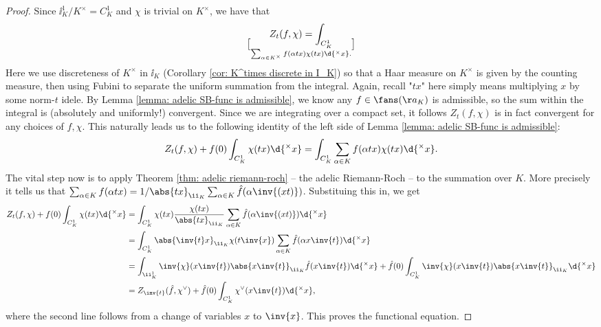\documentclass[11pt, x11names, openany]{book}
\begin{document}
\begin{proof}
Since $\ii_K^1 /K^\times = C^1_K $ and $\chi$ is trivial on $K^\times$, we have that
\begin{equation*}
    Z_t(f, \chi) = \int_{C^1_K} \brack{\sum_{\alpha \in K^\times} f(\alpha t x)}\chi(tx)\d{^\times x}.
\end{equation*}
Here we use discreteness of $K^\times$ in $\ii_K$ (Corollary \ref{cor: K^times discrete in I_K}) so that a Haar measure on $K^\times$ is given by the counting measure, then using Fubini to separate the uniform summation from the integral. Again, recall "$tx$" here simply means multiplying $x$ by some norm-$t$ idele. By Lemma \ref{lemma: adelic SB-func is admissible}, we know any $f \in \fans(\aa_K)$ is admissible, so the sum within the integral is (absolutely and uniformly!) convergent. Since we are integrating over a compact set, it follows $Z_t(f, \chi)$ is in fact convergent for any choices of $f, \chi$. This naturally leads us to the following identity of the left side of Lemma \ref{lemma: adelic SB-func is admissible}:
\begin{equation*}
    Z_t(f, \chi) + f(0) \int_{C^1_K} \chi(tx)\d{^\times x} = \int_{C^1_K} \sum_{\alpha \in K}f(\alpha t x) \chi(tx)\d{^\times x} . 
\end{equation*}
The vital step now is to apply Theorem \ref{thm: adelic riemann-roch} -- the adelic Riemann-Roch -- to the summation over $K$. More precisely it tells us that $\sum_{\alpha \in K}f(\alpha tx) = 1/\abs{tx}_{\ii_K} \sum_{\alpha \in K} \hat{f}(\alpha \inv{(xt)})$. Substituing this in, we get
\begin{align*}
    Z_t(f, \chi) + f(0) \int_{C^1_K} \chi(tx)\d{^\times x} &= \int_{C^1_K} \chi(tx) \frac{\chi(tx)}{\abs{tx}_{\ii_K}} \sum_{\alpha \in K}\hat{f}(\alpha \inv{(xt)}) \d{^\times x}\\
    &= \int_{C^1_K} \abs{\inv{t}x}_{\ii_K}\chi(t \inv{x}) \sum_{\alpha \in K}\hat{f}(\alpha x \inv{t}) \d{^\times x}\\
    &= \int_{\ii_K^1} \inv{\chi}(x\inv{t})\abs{x \inv{t}}_{\ii_K} \hat{f}(x \inv{t}) \d{^\times x} + \hat{f}(0) \int_{C^1_K} \inv{\chi}(x\inv{t})\abs{x \inv{t}}_{\ii_K} \d{^\times x}\\
    &= Z_{\inv{t}}(\hat{f}, \chi^\lor) + \hat{f}(0) \int_{C^1_K}\chi^\lor(x \inv{t})\d{^\times x},
\end{align*}
where the second line follows from a change of variables $x$ to $\inv{x}$. This proves the functional equation.
\end{proof}
\end{document}
